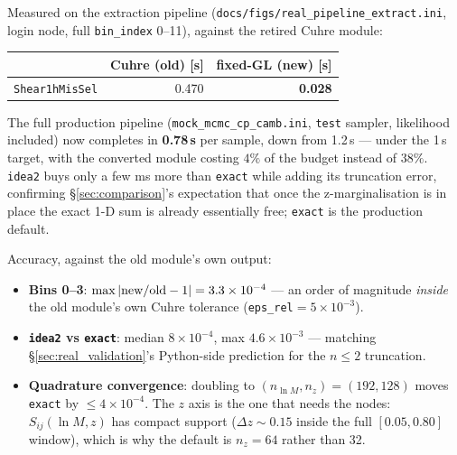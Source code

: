 \documentclass[a4paper, 11pt]{article}
\newcommand{\lnM}{\ln M}
\newcommand{\pyfile}[1]{{\small\texttt{#1}}}
\begin{document}
Measured on the extraction pipeline
(\pyfile{docs/figs/real\_pipeline\_extract.ini}, login node, full
\texttt{bin\_index} 0--11), against the retired Cuhre module:
\begin{center}
\small
\begin{tabular}{l r r}
\toprule
 & Cuhre (old) [s] & fixed-GL (new) [s] \\
\midrule
\texttt{Shear1hMisSel}  & 0.470 & \textbf{0.028} \\
\bottomrule
\end{tabular}
\end{center}
The full production pipeline (\texttt{mock\_mcmc\_cp\_camb.ini},
\texttt{test} sampler, likelihood included) now completes in
\textbf{0.78\,s} per sample, down from 1.2\,s --- under the 1\,s
target, with the converted module costing $4\%$ of the budget instead
of $38\%$. \texttt{idea2} buys only a few ms more than \texttt{exact}
while adding its truncation error, confirming
\S\ref{sec:comparison}'s expectation that once the z-marginalisation
is in place the exact 1-D sum is already essentially free;
\texttt{exact} is the production default.

Accuracy, against the old module's own output:
\begin{itemize}
\item \textbf{Bins 0--3}: $\max|{\rm new}/{\rm old}-1| = 3.3\times10^{-4}$
  --- an order of magnitude \emph{inside} the old module's own Cuhre
  tolerance (\texttt{eps\_rel}$=5\times10^{-3}$).
\item \textbf{\texttt{idea2} vs \texttt{exact}}: median
  $8\times10^{-4}$, max $4.6\times10^{-3}$ --- matching
  \S\ref{sec:real_validation}'s Python-side prediction for the $n\le2$
  truncation.
\item \textbf{Quadrature convergence}: doubling to
  $(n_{\lnM},n_z)=(192,128)$ moves \texttt{exact} by
  $\le4\times10^{-4}$. The $z$ axis is the one that needs the nodes:
  $S_{ij}(\lnM,z)$ has compact support ($\Delta z\sim0.15$ inside the
  full $[0.05,0.80]$ window), which is why the default is $n_z=64$
  rather than 32.
\end{itemize}
\end{document}
